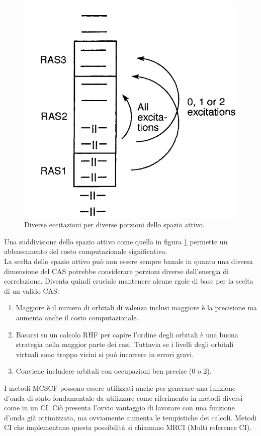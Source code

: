 \documentclass[oneside]{amsbook}
\numberwithin{section}{chapter}
\numberwithin{equation}{section}
\numberwithin{figure}{section}
\begin{document}
\begin{figure}[H]
\centering
\caption{Diverse eccitazioni per diverse porzioni dello spazio attivo.}\label{Ras}
\includegraphics[scale=0.3]{ras}
\end{figure}

Una suddivisione dello spazio attivo come quella in figura \ref{Ras} permette un abbassamento del costo computazionale significativo.\\
La scelta dello spazio attivo può non essere sempre banale in quanto una diversa dimensione del CAS potrebbe considerare porzioni diverse dell'energia di correlazione. Diventa quindi cruciale mantenere alcune rgole di base per la scelta di un valido CAS:
\begin{enumerate}
\item Maggiore è il numero di orbitali di valenza inclusi maggiore è la precisione ma aumenta anche il costo computazionale.
\item Basarsi su un calcolo RHF per capire l'ordine degli orbitali è una buona strategia nella maggior parte dei casi. Tuttavia se i livelli degli orbitali virtuali sono troppo vicini si può incorrere in errori gravi.
\item Conviene includere orbitali con occupazioni ben precise (0 o 2).
\end{enumerate}
I metodi MCSCF possono essere utilizzati anche per generare una funzione d'onda di stato fondamentale da utilizzare come riferimento in metodi diversi come in un CI. Ciò presenta l'ovvio vantaggio di lavorare con una funzione d'onda già ottimizzata, ma ovviamente aumenta le tempistiche dei calcoli. Metodi CI che implementano questa possibilità si chiamano MRCI (Multi reference CI).
\end{document}
